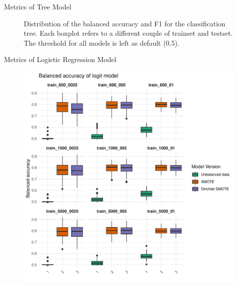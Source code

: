 \documentclass{beamer}
\begin{document}
\begin{frame}{Metrics of Tree Model}
\begin{figure}
\begin{minipage}{0.47\textwidth}
      \label{fig:label5}
    \end{minipage}
    \caption{Distribution of the balanced accuracy and F1 for the classification tree. Each boxplot refers to a different couple of trainset and testset. The threshold for all models is left as default (0.5).}
  \end{figure}
\end{frame}




\begin{frame}{Metrics of Logistic Regression Model}
  \begin{figure}
    \begin{minipage}{0.42\textwidth}
      \centering
      \includegraphics[width=\linewidth]{images/Logit_balanced_accuracy_default_threshold.pdf}
      \label{fig:label6}
    \end{minipage}
    \hfill
    \begin{minipage}{0.42\textwidth}
      \centering

\end{minipage}
\end{figure}
\end{frame}
\end{document}
